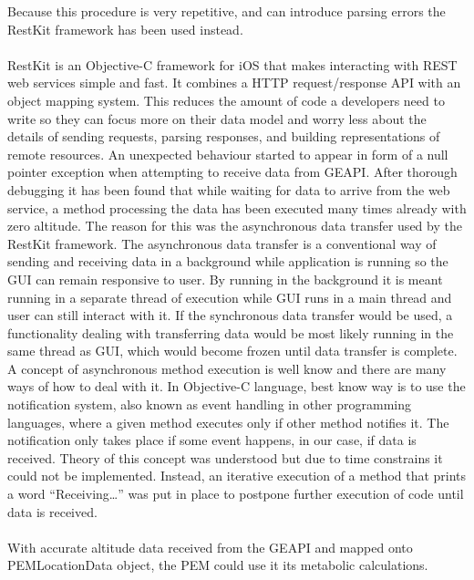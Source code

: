 \documentclass[12pt, a4paper]{report}   %
\begin{document}
\begin{enumerate}
Because this procedure is very repetitive, and can introduce parsing errors the RestKit framework has been used instead.\\ \\


RestKit is an Objective-C framework for iOS that makes interacting with REST web services simple and fast. It combines a HTTP request/response API with an object mapping system. This reduces the amount of code a developers need to write so they can focus more on their data model and worry less about the details of sending requests, parsing responses, and building representations of remote resources.
An unexpected behaviour started to appear in form of a null pointer exception when attempting to receive data from GEAPI. After thorough debugging it has been found that while waiting for data to arrive from the web service, a method processing the data has been executed many times already with zero altitude. The reason for this was the asynchronous data transfer used by the RestKit framework. The asynchronous data transfer is a conventional way of sending and receiving data in a background while application is running so the GUI can remain responsive to user. By running in the background it is meant running in a separate thread of execution while GUI runs in a main thread and user can still interact with it. If the synchronous data transfer would be used, a functionality dealing with transferring data would be most likely running in the same thread as GUI, which would become frozen until data transfer is complete. A concept of asynchronous method execution is well know and there are many ways of how to deal with it. In Objective-C language, best know way is to use the notification system, also known as event handling in other programming languages, where a given method executes only if other method notifies it. The notification only takes place if some event happens, in our case, if data is received. Theory of this concept was understood but due to time constrains it could not be implemented. Instead, an iterative execution of a method that prints a word “Receiving…” was put in place to postpone further execution of code until data is received.\\ \\
With accurate altitude data received from the GEAPI and mapped onto PEMLocationData object, the PEM could use it its metabolic calculations.


\clearpage

\end{enumerate}
\end{document}
